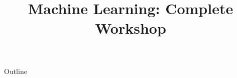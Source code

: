 \documentclass[xcolor=dvipsnames,compress,t,pdf,9pt]{beamer}
\title[\insertframenumber /\inserttotalframenumber]{Machine Learning: Complete Workshop}
\begin{document}
	\begin{frame}
	\titlepage
	\end{frame}

	\begin{frame}{Outline}
	    \tableofcontents
	\end{frame}

	
	
	
\end{document}
